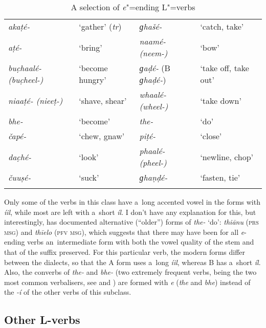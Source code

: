 \begin{table}
\caption{A selection of \textit{e}"=ending L"=verbs}
\begin{tabularx}{\textwidth}{ Q Q Q Q }
\lsptoprule
\textit{akaṭé-} &
`gather' (\textit{tr}) &
\textit{ɡhašé-} &
`catch, take'\\
\textit{aṭé-} &
`bring' &
\textit{naamé- (neem-)} &
`bow'\\
\textit{buc̣haalé- (buc̣heel-)} &
`become hungry' &
\textit{ɡaḍé-} (B \textit{ɡhaḍé-}) &
`take off, take out'\\
\textit{niaaṭé- (nieeṭ-)} &
`shave, shear' &
\textit{whaalé- (wheel-)} &
`take down'\\
\textit{bhe-} &
`become' &
\textit{the-} &
`do'\\
\textit{čapé-} &
`chew, gnaw' &
\textit{piṭé-} &
`close'\\
\textit{dac̣hé-} &
`look' &
\textit{phaalé- (pheel-)} &
`newline, chop'\\
\textit{čuuṣé-} &
`suck' &
\textit{ɡhaṇḍé-} &
`fasten, tie' \\\lspbottomrule
\end{tabularx}
\label{tab:8-le}
\end{table}


Only some of the verbs in this class have a~long accented vowel in the  forms with
\textit{íil}, while most are left with a~short \textit{íl}. I don't have any explanation for
this, but interestingly, \citet[22--23]{morgenstierne1941} has documented alternative (``older'')
forms of \textit{the-} `do': \textit{thiānu} (\textsc{prs msg}) and \textit{thīelo}
(\textsc{pfv msg}), which suggests that there may have been for all \textit{e}-ending verbs
an~intermediate form with both the vowel quality of the stem and that of the suffix preserved. For
this particular verb, the modern  forms differ between the dialects, so that the A form
uses a~long \textit{íil}, whereas B has a~short \textit{íl}. Also, the converbs of
\textit{the-} and \textit{bhe-} (two extremely frequent verbs, being the two most common
verbalisers, see  and ) are formed with \textit{e}
(\textit{the} and \textit{bhe}) instead of the \textit{-í} of the other verbs of this subclass.


\subsection{Other L-verbs}
\label{subsec:8-3-4}


